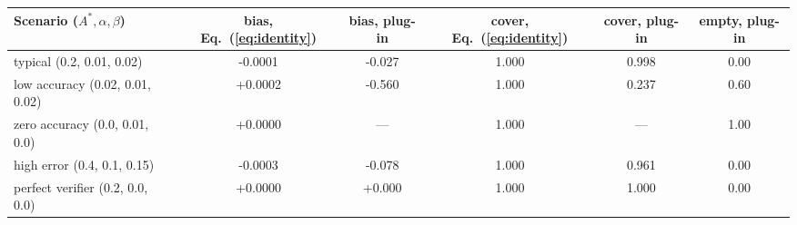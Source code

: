 \begin{tabular}{@{}lccccc@{}}
\toprule
Scenario ($A^\ast,\alpha,\beta$) & bias, Eq.~(\ref{eq:identity}) & bias, plug-in & cover, Eq.~(\ref{eq:identity}) & cover, plug-in & empty, plug-in \\
\midrule
typical (0.2, 0.01, 0.02) & -0.0001 & -0.027 & 1.000 & 0.998 & 0.00 \\
low accuracy (0.02, 0.01, 0.02) & +0.0002 & -0.560 & 1.000 & 0.237 & 0.60 \\
zero accuracy (0.0, 0.01, 0.0) & +0.0000 & --- & 1.000 & --- & 1.00 \\
high error (0.4, 0.1, 0.15) & -0.0003 & -0.078 & 1.000 & 0.961 & 0.00 \\
perfect verifier (0.2, 0.0, 0.0) & +0.0000 & +0.000 & 1.000 & 1.000 & 0.00 \\
\bottomrule
\end{tabular}
